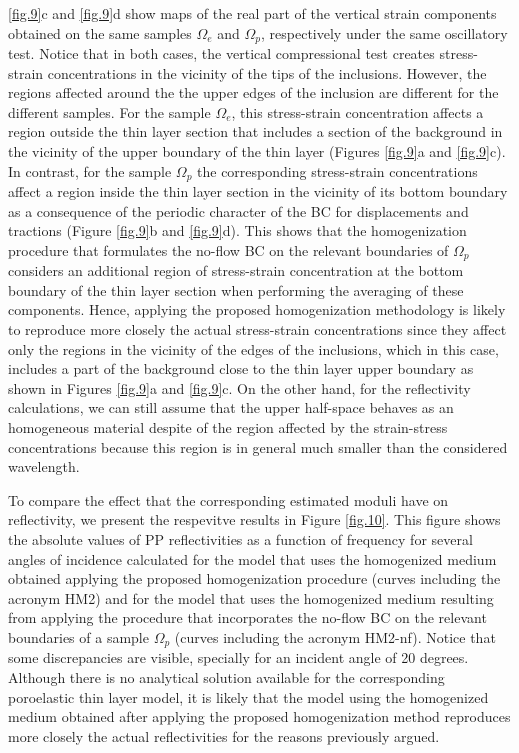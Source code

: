 \documentclass[draft]{agujournal2019}
\begin{document}
 \ref{fig.9}c and \ref{fig.9}d show maps of the real part of the vertical strain components obtained on the same samples  $\Omega_e$ and $\Omega_p$, respectively under the same oscillatory test. Notice that in both cases, the vertical compressional test creates stress-strain concentrations in the vicinity of the tips of the inclusions. However, the regions affected around the the upper edges of the inclusion are different for the different samples. For the sample $\Omega_e$, this stress-strain concentration affects a region outside the thin layer section that includes a section of the  background in the vicinity of the upper boundary of the thin layer (Figures \ref{fig.9}a and \ref{fig.9}c). In contrast, for the sample $\Omega_p$  the corresponding stress-strain concentrations affect a region inside the thin layer section in the vicinity of its bottom boundary as a consequence of the periodic character of the BC for displacements and tractions (Figure \ref{fig.9}b and \ref{fig.9}d). This shows that the homogenization procedure that formulates the no-flow BC on the relevant boundaries of $\Omega_p$ considers an additional region of stress-strain concentration at the bottom boundary of the thin layer section when performing the averaging of these components. Hence, applying the proposed homogenization methodology is likely to reproduce more closely the actual stress-strain concentrations since they affect only the regions in the vicinity of the edges of the inclusions, which in this case, includes a part of the background close to the thin layer upper boundary as shown in Figures \ref{fig.9}a and \ref{fig.9}c. On the other hand, for the reflectivity calculations, we can still assume that the upper half-space behaves as an homogeneous material despite of the region affected by the strain-stress concentrations because this region is in general much smaller than the considered wavelength.

To compare the effect that the corresponding estimated moduli have on  reflectivity, we present the respevitve results in Figure \ref{fig.10}. This figure shows the absolute values of PP reflectivities as a function of frequency for several angles of incidence calculated for the model that uses the homogenized medium obtained applying the proposed homogenization procedure (curves including the acronym HM2) and for the model that uses the homogenized medium resulting from applying the procedure that incorporates the no-flow BC on the relevant boundaries of a sample $\Omega_p$ (curves including the acronym HM2-nf). Notice that some discrepancies are visible, specially for an incident angle of 20 degrees. Although there is no analytical solution available for the corresponding poroelastic thin layer model, it is likely that the model using the homogenized medium obtained after applying the proposed homogenization method reproduces more closely the actual reflectivities for the reasons previously argued. %
\end{document}
